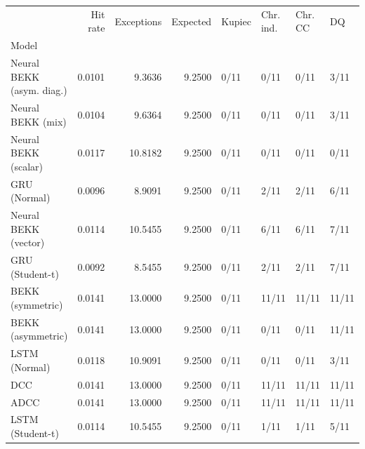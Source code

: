 \begin{tabular}{lrrrllll}
\toprule
 & Hit rate & Exceptions & Expected & Kupiec & Chr. ind. & Chr. CC & DQ \\
Model &  &  &  &  &  &  &  \\
\midrule
Neural BEKK (asym. diag.) & 0.0101 & 9.3636 & 9.2500 & 0/11 & 0/11 & 0/11 & 3/11 \\
Neural BEKK (mix) & 0.0104 & 9.6364 & 9.2500 & 0/11 & 0/11 & 0/11 & 3/11 \\
Neural BEKK (scalar) & 0.0117 & 10.8182 & 9.2500 & 0/11 & 0/11 & 0/11 & 0/11 \\
GRU (Normal) & 0.0096 & 8.9091 & 9.2500 & 0/11 & 2/11 & 2/11 & 6/11 \\
Neural BEKK (vector) & 0.0114 & 10.5455 & 9.2500 & 0/11 & 6/11 & 6/11 & 7/11 \\
GRU (Student-t) & 0.0092 & 8.5455 & 9.2500 & 0/11 & 2/11 & 2/11 & 7/11 \\
BEKK (symmetric) & 0.0141 & 13.0000 & 9.2500 & 0/11 & 11/11 & 11/11 & 11/11 \\
BEKK (asymmetric) & 0.0141 & 13.0000 & 9.2500 & 0/11 & 0/11 & 0/11 & 11/11 \\
LSTM (Normal) & 0.0118 & 10.9091 & 9.2500 & 0/11 & 0/11 & 0/11 & 3/11 \\
DCC & 0.0141 & 13.0000 & 9.2500 & 0/11 & 11/11 & 11/11 & 11/11 \\
ADCC & 0.0141 & 13.0000 & 9.2500 & 0/11 & 11/11 & 11/11 & 11/11 \\
LSTM (Student-t) & 0.0114 & 10.5455 & 9.2500 & 0/11 & 1/11 & 1/11 & 5/11 \\
\bottomrule
\end{tabular}

